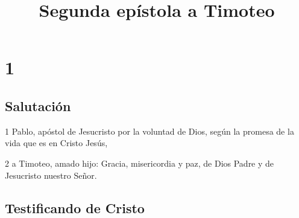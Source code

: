 
\title{Segunda epístola a Timoteo}

\chapter{1}

\section*{Salutación}

\par 1 Pablo, apóstol de Jesucristo por la voluntad de Dios, según la promesa de la vida que es en Cristo Jesús,
\par 2 a Timoteo, amado hijo: Gracia, misericordia y paz, de Dios Padre y de Jesucristo nuestro Señor.

\section*{Testificando de Cristo}

